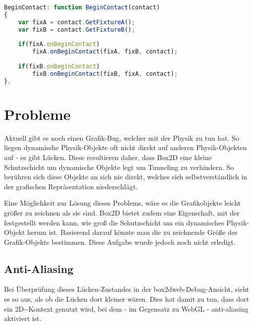 \begin{lstlisting}[language=JavaScript]
BeginContact: function BeginContact(contact)
{
	var fixA = contact.GetFixtureA();
	var fixB = contact.GetFixtureB();
	
	if(fixA.onBeginContact)
		fixA.onBeginContact(fixA, fixB, contact);
		
	if(fixB.onBeginContact)
		fixB.onBeginContact(fixB, fixA, contact);
},
\end{lstlisting}

\section{Probleme}

Aktuell gibt es noch einen Grafik-Bug, welcher mit der Physik zu tun hat. So liegen dynamische Physik-Objekte oft nicht direkt auf anderen Physik-Objekten auf - es gibt Lücken. Diese resultieren daher, dass Box2D eine kleine Schutzschicht um dynamische Objekte legt um Tunneling zu verhindern. So berühren sich diese Objekte an sich nie direkt, welches sich selbstverständlich in der grafischen Repräsentation niederschlägt.


Eine Möglichkeit zur Lösung dieses Problems, wäre es die Grafikobjekte leicht größer zu zeichnen als sie sind. Box2D bietet zudem eine Eigenschaft, mit der festgestellt werden kann, wie groß die Schutzschicht um ein dynamisches Physik-Objekt herum ist. Basierend darauf könnte man die zu zeichnende Größe des Grafik-Objekts bestimmen. Diese Aufgabe wurde jedoch noch nicht erledigt.

\subsection{Anti-Aliasing}

Bei Überprüfung dieses Lücken-Zustandes in der box2dweb-Debug-Ansicht, sieht es so aus, als ob die Lücken dort kleiner wären. Dies hat damit zu tun, dass dort ein 2D--Kontext genutzt wird, bei dem - im Gegensatz zu WebGL - anti-aliasing aktiviert ist.

